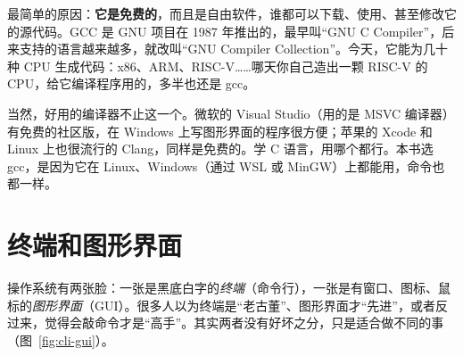 最简单的原因：\textbf{它是免费的}，而且是自由软件，谁都可以下载、使用、甚至修改它的源代码。GCC 是 GNU 项目在 1987 年推出的，最早叫“GNU C Compiler”，后来支持的语言越来越多，就改叫“GNU Compiler Collection”。今天，它能为几十种 CPU 生成代码：x86、ARM、RISC-V……哪天你自己造出一颗 RISC-V 的 CPU，给它编译程序用的，多半也还是 gcc。

当然，好用的编译器不止这一个。微软的 Visual Studio（用的是 MSVC 编译器）有免费的社区版，在 Windows 上写图形界面的程序很方便；苹果的 Xcode 和 Linux 上也很流行的 Clang，同样是免费的。学 C 语言，用哪个都行。本书选 gcc，是因为它在 Linux、Windows（通过 WSL 或 MinGW）上都能用，命令也都一样。

\section{终端和图形界面}

操作系统有两张脸：一张是黑底白字的\emph{终端}（命令行），一张是有窗口、图标、鼠标的\emph{图形界面}（GUI）。很多人以为终端是“老古董”、图形界面才“先进”，或者反过来，觉得会敲命令才是“高手”。其实两者没有好坏之分，只是适合做不同的事（图~\ref{fig:cli-gui}）。

